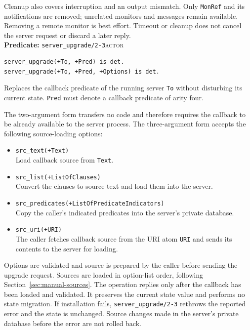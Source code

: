 Cleanup also covers interruption and an output mismatch. Only \texttt{MonRef} and its notifications
are removed; unrelated monitors and messages remain available. Removing a remote monitor is best
effort. Timeout or cleanup does not cancel the server request or discard a later reply.\\




\noindent \textbf{Predicate:}
\texttt{server\_\allowbreak{}upgrade/\allowbreak{}2-3}\hfill\textsc{actor}

\begin{verbatim}
server_upgrade(+To, +Pred) is det.
server_upgrade(+To, +Pred, +Options) is det.
\end{verbatim}

\noindent Replaces the callback predicate of the running server \texttt{To}
without disturbing its current state. \texttt{Pred} must denote a callback
predicate of arity four.

The two-argument form transfers no code and therefore requires the callback
to be already available to the server process. The three-argument
form accepts the following source-loading options:

\begin{itemize}
\item
  \texttt{src\_\allowbreak{}text(\allowbreak{}+Text)}\\
  Load callback source from \texttt{Text}.
\item
  \texttt{src\_\allowbreak{}list(\allowbreak{}+ListOfClauses)}\\
  Convert the clauses to source text and load them into the server.
\item
  \texttt{src\_\allowbreak{}predicates(\allowbreak{}+ListOfPredicateIndicators)}\\
  Copy the caller's indicated predicates into the server's private database.
\item
  \texttt{src\_\allowbreak{}uri(\allowbreak{}+URI)}\\
  The caller fetches callback source from the URI atom \texttt{URI} and
  sends its contents to the server for loading.
\end{itemize}

\noindent Options are validated and source is prepared by the caller before
sending the upgrade request. Sources are loaded in option-list order, following
Section~\ref{sec:manual-sources}. The operation replies only after the callback
has been loaded and validated. It preserves the current state value and performs no state
migration. If installation fails, \texttt{server\_\allowbreak{}upgrade/\allowbreak{}2-3} rethrows the
reported error and the state is unchanged. Source changes made in the server's
private database before the error are not rolled back.\\

